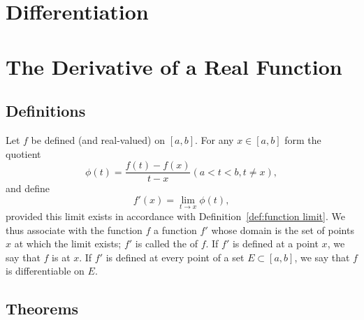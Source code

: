 \section{Differentiation}

\section{The Derivative of a Real Function}
\subsection{Definitions}
\begin{deff}
	Let $f$ be defined (and real-valued) on $[a,b]$. For any $x \in [a,b]$ form the quotient $$\phi(t) = \frac{f(t)-f(x)}{t-x} (a<t<b, t \ne x),$$ and define $$f'(x) = \lim_{t \to x} \phi(t),$$ provided this limit exists in accordance with Definition~\ref{def:function limit}. We thus associate with the function $f$ a function $f'$ whose domain is the set of points $x$ at which the limit exists; $f'$ is called the {} of $f$. If $f'$ is defined at a point $x$, we say that $f$ is {} at $x$. If $f'$ is defined at every point of a set $E \subset [a,b]$, we say that $f$ is differentiable on $E$.
\end{deff}

\subsection{Theorems}



